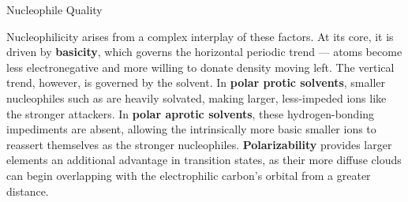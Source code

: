 \documentclass[10pt]{article}
\begin{document}
\begin{core}{Nucleophile Quality}
\begin{enumerate}
    \end{enumerate}

    Nucleophilicity arises from a complex interplay of these factors. At its core, it is driven by \textbf{basicity}, which governs the horizontal periodic trend --- atoms become less electronegative and more willing to donate  density moving left. The vertical trend, however, is governed by the solvent. In \textbf{polar protic solvents}, smaller nucleophiles such as  are heavily solvated, making larger, less-impeded ions like  the stronger attackers. In \textbf{polar aprotic solvents}, these hydrogen-bonding impediments are absent, allowing the intrinsically more basic smaller ions to reassert themselves as the stronger nucleophiles. \textbf{Polarizability} provides larger elements an additional advantage in \snt transition states, as their more diffuse  clouds can begin overlapping with the electrophilic carbon's orbital from a greater distance.


  \end{core}
\end{document}
